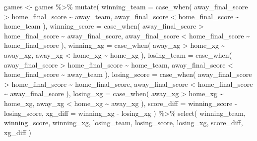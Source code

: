 \documentclass[
]{article}
\newenvironment{Shaded}{\begin{snugshade}}{\end{snugshade}}
\newcommand{\AttributeTok}[1]{\textcolor[rgb]{0.77,0.63,0.00}{#1}}
\newcommand{\FunctionTok}[1]{\textcolor[rgb]{0.00,0.00,0.00}{#1}}
\newcommand{\NormalTok}[1]{#1}
\newcommand{\OtherTok}[1]{\textcolor[rgb]{0.56,0.35,0.01}{#1}}
\newcommand{\SpecialCharTok}[1]{\textcolor[rgb]{0.00,0.00,0.00}{#1}}
\begin{document}
\begin{Shaded}
\begin{Highlighting}[]
\NormalTok{games }\OtherTok{\textless{}{-}}\NormalTok{ games }\SpecialCharTok{\%\textgreater{}\%}
  \FunctionTok{mutate}\NormalTok{(}
    \AttributeTok{winning\_team =} \FunctionTok{case\_when}\NormalTok{(}
\NormalTok{      away\_final\_score }\SpecialCharTok{\textgreater{}}\NormalTok{ home\_final\_score }\SpecialCharTok{\textasciitilde{}}\NormalTok{ away\_team,}
\NormalTok{      away\_final\_score }\SpecialCharTok{\textless{}}\NormalTok{ home\_final\_score }\SpecialCharTok{\textasciitilde{}}\NormalTok{ home\_team}
\NormalTok{    ),}
    \AttributeTok{winning\_score =} \FunctionTok{case\_when}\NormalTok{(}
\NormalTok{      away\_final\_score }\SpecialCharTok{\textgreater{}}\NormalTok{ home\_final\_score }\SpecialCharTok{\textasciitilde{}}\NormalTok{ away\_final\_score,}
\NormalTok{      away\_final\_score }\SpecialCharTok{\textless{}}\NormalTok{ home\_final\_score }\SpecialCharTok{\textasciitilde{}}\NormalTok{ home\_final\_score}
\NormalTok{    ),}
    \AttributeTok{winning\_xg =} \FunctionTok{case\_when}\NormalTok{(}
\NormalTok{      away\_xg }\SpecialCharTok{\textgreater{}}\NormalTok{ home\_xg }\SpecialCharTok{\textasciitilde{}}\NormalTok{ away\_xg,}
\NormalTok{      away\_xg }\SpecialCharTok{\textless{}}\NormalTok{ home\_xg }\SpecialCharTok{\textasciitilde{}}\NormalTok{ home\_xg}
\NormalTok{    ),}
    \AttributeTok{losing\_team =} \FunctionTok{case\_when}\NormalTok{(}
\NormalTok{      away\_final\_score }\SpecialCharTok{\textgreater{}}\NormalTok{ home\_final\_score }\SpecialCharTok{\textasciitilde{}}\NormalTok{ home\_team,}
\NormalTok{      away\_final\_score }\SpecialCharTok{\textless{}}\NormalTok{ home\_final\_score }\SpecialCharTok{\textasciitilde{}}\NormalTok{ away\_team}
\NormalTok{    ),}
    \AttributeTok{losing\_score =} \FunctionTok{case\_when}\NormalTok{(}
\NormalTok{      away\_final\_score }\SpecialCharTok{\textgreater{}}\NormalTok{ home\_final\_score }\SpecialCharTok{\textasciitilde{}}\NormalTok{ home\_final\_score,}
\NormalTok{      away\_final\_score }\SpecialCharTok{\textless{}}\NormalTok{ home\_final\_score }\SpecialCharTok{\textasciitilde{}}\NormalTok{ away\_final\_score}
\NormalTok{    ),}
    \AttributeTok{losing\_xg =} \FunctionTok{case\_when}\NormalTok{(}
\NormalTok{      away\_xg }\SpecialCharTok{\textgreater{}}\NormalTok{ home\_xg }\SpecialCharTok{\textasciitilde{}}\NormalTok{ home\_xg,}
\NormalTok{      away\_xg }\SpecialCharTok{\textless{}}\NormalTok{ home\_xg }\SpecialCharTok{\textasciitilde{}}\NormalTok{ away\_xg}
\NormalTok{    ),}
    \AttributeTok{score\_diff =}\NormalTok{ winning\_score }\SpecialCharTok{{-}}\NormalTok{ losing\_score,}
    \AttributeTok{xg\_diff =}\NormalTok{ winning\_xg }\SpecialCharTok{{-}}\NormalTok{ losing\_xg}
\NormalTok{  ) }\SpecialCharTok{\%\textgreater{}\%}
  \FunctionTok{select}\NormalTok{(}
\NormalTok{    winning\_team, winning\_score, winning\_xg,}
\NormalTok{    losing\_team, losing\_score, losing\_xg, score\_diff, xg\_diff}
\NormalTok{  )}


\end{Highlighting}
\end{Shaded}
\end{document}
